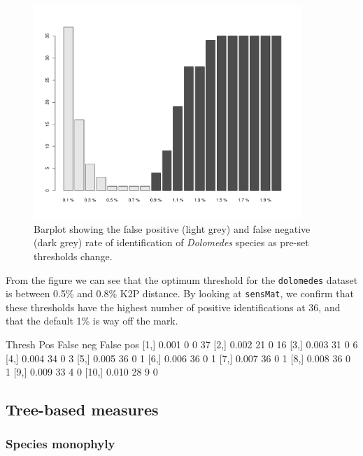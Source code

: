 \documentclass{article}
\newcommand{\fun}[1]{\texttt{#1}}
\begin{document}
\begin{figure}[p]
	\centering
	\includegraphics[width=0.9\textwidth,trim= 3cm 0cm 3cm 0cm]{sensitivity2}
	\caption{Barplot showing the false positive (light grey) and false negative (dark grey) rate of identification of \emph{Dolomedes} species as pre-set thresholds change.}
	\label{sensitivity.fig}
\end{figure}

From the figure we can see that the optimum threshold for the \fun{dolomedes} dataset is between 0.5\% and 0.8\% K2P distance. By looking at \fun{sensMat}, we confirm that these thresholds have the highest number of positive identifications at 36, and that the default 1\% is way off the mark.

\begin{Routput}
      Thresh Pos False neg False pos
 [1,]  0.001   0         0        37
 [2,]  0.002  21         0        16
 [3,]  0.003  31         0         6
 [4,]  0.004  34         0         3
 [5,]  0.005  36         0         1
 [6,]  0.006  36         0         1
 [7,]  0.007  36         0         1
 [8,]  0.008  36         0         1
 [9,]  0.009  33         4         0
[10,]  0.010  28         9         0
\end{Routput}

\subsection{Tree-based measures}

\subsubsection{Species monophyly}
\end{document}
